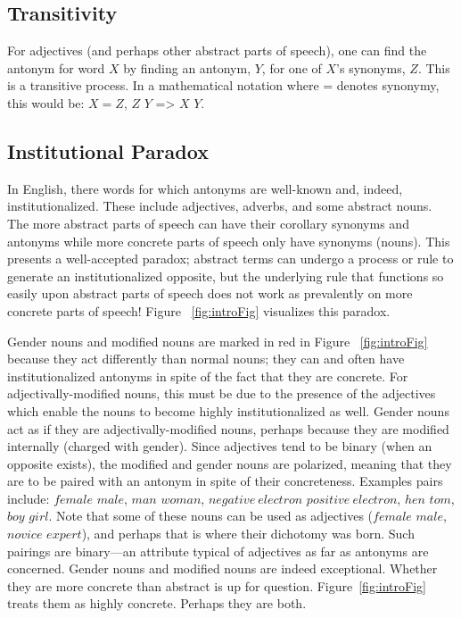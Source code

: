 \subsection {Transitivity} For adjectives (and perhaps other abstract parts of speech), one can find the antonym for word $X$ by finding an antonym, $Y$, for one of $X$’s synonyms, $Z$.  This is a transitive process.  In a mathematical notation where = denotes synonymy, this would be: $X = Z$, $Z$ \opp $Y$ => $X$ \opp $Y$.

\subsection {Institutional Paradox} In English, there words for which antonyms are well-known and, indeed, institutionalized.  These include adjectives, adverbs, and some abstract nouns.  The more abstract parts of speech can have their corollary synonyms and antonyms while more concrete parts of speech only have synonyms (nouns). This presents a well-accepted paradox; abstract terms can undergo a process or rule to generate an institutionalized opposite, but the underlying rule that functions so easily upon abstract parts of speech does not work as prevalently on more concrete parts of speech!  Figure ~\ref{fig:introFig} visualizes this paradox.

Gender nouns and modified nouns are marked in red in Figure ~\ref{fig:introFig} because they act differently than normal nouns; they can and often have institutionalized antonyms in spite of the fact that they are concrete.  For adjectivally-modified nouns, this must be due to the presence of the adjectives which enable the nouns to become highly institutionalized as well.  Gender nouns act as if they are adjectivally-modified nouns, perhaps because they are modified internally (charged with gender).  Since adjectives tend to be binary (when an opposite exists), the modified and gender nouns are polarized, meaning that they are to be paired with an antonym in spite of their concreteness.  Examples pairs include: $female$ \opp $male$, $man$ \opp $woman$, $negative~electron$ \opp $positive~electron$, $hen$ \opp $tom$, $boy$ \opp $girl$.  Note that some of these nouns can be used as adjectives ($female$ \opp $male$, $novice$ \opp $expert$), and perhaps that is where their dichotomy was born.  Such pairings are binary---an attribute typical of adjectives as far as antonyms are concerned.  Gender nouns and modified nouns are indeed exceptional.  Whether they are more concrete than abstract is up for question.  Figure~\ref{fig:introFig} treats them as highly concrete.  Perhaps they are both.    

